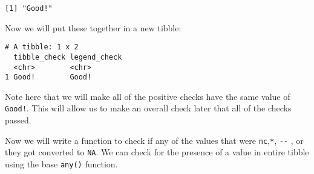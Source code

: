 \documentclass[
]{article}
\newenvironment{Shaded}{\begin{snugshade}}{\end{snugshade}}
\newcommand{\CommentTok}[1]{\textcolor[rgb]{0.56,0.35,0.01}{\textit{#1}}}
\newcommand{\ControlFlowTok}[1]{\textcolor[rgb]{0.13,0.29,0.53}{\textbf{#1}}}
\newcommand{\DataTypeTok}[1]{\textcolor[rgb]{0.13,0.29,0.53}{#1}}
\newcommand{\FloatTok}[1]{\textcolor[rgb]{0.00,0.00,0.81}{#1}}
\newcommand{\KeywordTok}[1]{\textcolor[rgb]{0.13,0.29,0.53}{\textbf{#1}}}
\newcommand{\NormalTok}[1]{#1}
\newcommand{\OperatorTok}[1]{\textcolor[rgb]{0.81,0.36,0.00}{\textbf{#1}}}
\newcommand{\OtherTok}[1]{\textcolor[rgb]{0.56,0.35,0.01}{#1}}
\newcommand{\StringTok}[1]{\textcolor[rgb]{0.31,0.60,0.02}{#1}}
\begin{document}
\begin{verbatim}
[1] "Good!"
\end{verbatim}

Now we will put these together in a new tibble:

\begin{Shaded}
\end{Shaded}

\begin{verbatim}
# A tibble: 1 x 2
  tibble_check legend_check
  <chr>        <chr>       
1 Good!        Good!       
\end{verbatim}

Note here that we will make all of the positive checks have the same
value of \texttt{Good!}. This will allow us to make an overall check
later that all of the checks passed.

Now we will write a function to check if any of the values that were
\texttt{nc},\texttt{*}, \texttt{-\/-} , or they got converted to
\texttt{NA}. We can check for the presence of a value in entire tibble
using the base \texttt{any()} function.
\end{document}
